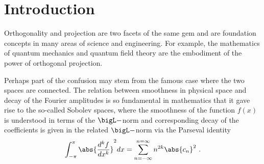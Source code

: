 \section{Introduction}
Orthogonality and projection are two facets of the same gem and are foundation concepts in many areas of science and engineering. For example, the  mathematics of quantum mechanics and quantum field theory are the embodiment of the power of orthogonal projection.

Perhaps part of the confusion may stem from the famous case where the two spaces are connected. 
The relation between smoothness in physical space and decay of the Fourier amplitudes is so fundamental in mathematics that it gave rise to the so-called Sobolev spaces, where the smoothness of the function $f(x)$ is understood in terms of the $\bigL-$norm and corresponding decay of the coefficients is given in the related $\bigL-$norm via the Parseval identity
  \begin{equation}
    \int_{-\pi}^{\pi} \abs{\frac{d^{k}f}{dx^{k}}}^{2} dx = \sum_{n=-\infty}^{n=\infty} n^{2k} \abs{c_{n}}^{2} \ .
  \end{equation}

\endinput %